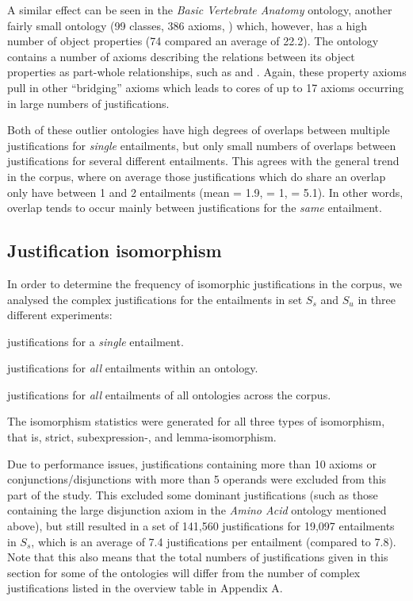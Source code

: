 A similar effect can be seen in the \emph{Basic Vertebrate Anatomy} ontology, another fairly small ontology (99 classes, 386 axioms, ) which, however, has a high number of object properties (74 compared an average of 22.2). The ontology contains a number of axioms describing the relations between its object properties as part-whole relationships, such as  and . Again, these property axioms pull in other \enquote{bridging} axioms which leads to cores of up to 17 axioms occurring in large numbers of justifications.

Both of these outlier ontologies have high degrees of overlaps between multiple justifications for \emph{single} entailments, but only small numbers of overlaps between justifications for several different entailments. This agrees with the general trend in the corpus, where on average those  justifications which do share an overlap only have between 1 and 2 entailments (mean = 1.9, \median = 1, \sdev = 5.1). In other words, overlap tends to occur mainly between justifications for the \emph{same} entailment.


\subsection{Justification isomorphism}

In order to determine the frequency of isomorphic justifications in the corpus, we analysed the complex justifications for the entailments in set $S_{s}$ and $S_{u}$ in three different experiments: 
\begin{compactenum}
\item justifications for a \emph{single} entailment.
\item justifications for \emph{all} entailments within an ontology.
\item justifications for \emph{all} entailments of all ontologies across the corpus.
\end{compactenum}
The isomorphism statistics were generated for all three types of isomorphism, that is, strict, subexpression-, and lemma-isomorphism. 

Due to performance issues, justifications containing more than 10 axioms or conjunctions/disjunctions with more than 5 operands were excluded from this part of the study. This excluded some dominant justifications (such as those containing the large disjunction axiom in the \emph{Amino Acid} ontology mentioned above), but still resulted in a set of 141,560 justifications for 19,097 entailments in $S_{s}$, which is an average of 7.4 justifications per entailment (compared to 7.8). Note that this also means that the total numbers of justifications given in this section for some of the ontologies will differ from the number of complex justifications listed in the overview table in Appendix A.

